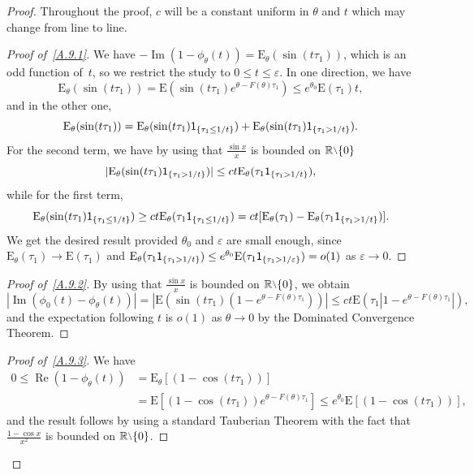 \documentclass[10pt]{amsart}
\theoremstyle{definition}\newtheorem{defi}[theo]{Definition}\newtheorem{rema}[theo]{Remark}\newtheorem{exam}[theo]{Example}\newtheorem{exem}[theo]{Example}\newtheorem{nota}[theo]{Notation}
\DeclareMathOperator{\re}{Re}
\DeclareMathOperator{\im}{Im}
\newcommand{\bbR}{{\ensuremath{\mathbb R}}}
\newcommand{\gep}{\varepsilon}
\newcommand{\gt}{\theta}
\newcommand\bE{\ensuremath{\mathrm{E}}}
\newcommand{\ind}{{\sf 1}}
\newcommand{\sm}{{\raise0.3ex\hbox{$\scriptstyle \setminus$}}}
\newenvironment{step}[1]{\begin{proof}[{#1}]}{\let\qed\relax \end{proof}}
\begin{document}
\begin{proof}
Throughout the proof, $c$ will be a constant uniform in $\gt$ and $t$ which may change from line to line.

\begin{step}{Proof of~\eqref{A.9.1}}
We have $-\im(1- \phi_\gt(t)) = \bE_\gt (\sin(t\tau_1))$, which is an odd function of~$t$, so we restrict the study to $0\le t\le \gep$. In one direction, we have
\begin{equation}
\bE_\gt (\sin(t\tau_1)) = \bE(\sin(t\tau_1)e^{\gt - F(\gt)\tau_1}) \le e^{\gt_0}\bE(\tau_1) t,
\end{equation}
and in the other one,
\begin{equation}
\bE_\gt (\sin(t\tau_1)) = \bE_\gt (\sin(t\tau_1)\ind_{\{\tau_1 \le 1/t\}}) + \bE_\gt (\sin(t\tau_1)\ind_{\{\tau_1 > 1/t\}}).
\end{equation}
For the second term, we have by using that $\frac{\sin x}{x}$ is bounded on $\bbR\sm\{0\}$
\begin{equation}
|\bE_\gt (\sin(t\tau_1)\ind_{\{\tau_1 > 1/t\}})| \le ct\bE_\gt(\tau_1 \ind_{\{\tau_1 > 1/t\}}),
\end{equation}
while for the first term,
\begin{equation}
\bE_\gt (\sin(t\tau_1)\ind_{\{\tau_1 \le 1/t\}}) \ge ct \bE_\gt(\tau_1 \ind_{\{\tau_1 \le 1/t\}}) = ct [\bE_\gt(\tau_1) - \bE_\gt(\tau_1 \ind_{\{\tau_1 > 1/t\}})].
\end{equation}
We get the desired result provided $\gt_0$ and $\gep$ are small enough, since $\bE_\gt(\tau_1) \to \bE(\tau_1)$ and $\bE_\gt(\tau_1 \ind_{\{\tau_1 > 1/t\}}) \le e^{\gt_0} \bE(\tau_1 \ind_{\{\tau_1 > 1/\gep\}}) = o(1)$ as $\gep\to 0$.
\end{step}

\begin{step}{Proof of~\eqref{A.9.2}}
By using that $\frac{\sin x}{x}$ is bounded on $\bbR\sm\{0\}$, we obtain
\begin{equation}
|{\im(\phi_0(t) -\phi_\gt(t))}| = | \bE(\sin(t\tau_1) (1-e^{\gt - F(\gt)\tau_1})) | \le ct \bE(\tau_1|1-e^{\gt - F(\gt)\tau_1}|),
\end{equation} and the expectation following $t$ is $o(1)$ as $\gt\to 0$ by the Dominated Convergence Theorem.
\end{step}

\begin{step}{Proof of~\eqref{A.9.3}}
We have
\begin{equation}
\begin{aligned}
0 \le \re(1- \phi_\gt(t)) &= \bE_\gt[(1-\cos(t\tau_1))]\\
&= \bE[(1-\cos(t\tau_1))e^{\gt-F(\gt)\tau_1}] \le e^{\gt_0} \bE[(1-\cos(t\tau_1))],
\end{aligned}
\end{equation} and the result follows by using a standard Tauberian Theorem with the fact that $\frac{1-\cos x}{x^2}$ is bounded on $\bbR\sm\{0\}$.
\end{step}


\end{proof}
\end{document}
